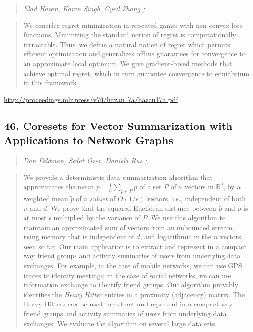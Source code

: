 \documentclass{article}
\begin{document}
\begin{quote}
\footnotesize{\textit{Elad Hazan, Karan Singh, Cyril Zhang ;}}

\end{quote}

\begin{quote}
    We consider regret minimization in repeated games with non-convex loss functions. Minimizing the standard notion of regret is computationally intractable. Thus, we define a natural notion of regret which permits efficient optimization and generalizes offline guarantees for convergence to an approximate local optimum. We give gradient-based methods that achieve optimal regret, which in turn guarantee convergence to equilibrium in this framework.  
\end{quote}

\href{http://proceedings.mlr.press/v70/hazan17a/hazan17a.pdf}{http://proceedings.mlr.press/v70/hazan17a/hazan17a.pdf}

\subsection{46. Coresets for Vector Summarization with Applications to Network Graphs}

\begin{quote}
\footnotesize{\textit{Dan Feldman, Sedat Ozer, Daniela Rus ;}}

\end{quote}

\begin{quote}
    We provide a deterministic data summarization algorithm that approximates the mean $\bar{p}=\frac{1}{n}\sum_{p\in P} p$ of a set $P$ of $n$ vectors in $\mathbb{R}^d$, by a weighted mean $\tilde{p}$ of a \textit{subset} of $O(1/\epsilon)$ vectors, i.e., independent of both $n$ and $d$. We prove that the squared Euclidean distance between $\bar{p}$ and $\tilde{p}$ is at most $\epsilon$ multiplied by the variance of $P$. We use this algorithm to maintain an approximated sum of vectors from an unbounded stream, using memory that is independent of $d$, and logarithmic in the $n$ vectors seen so far. Our main application is to extract and represent in a compact way friend groups and activity summaries of users from underlying data exchanges. For example, in the case of mobile networks, we can use GPS traces to identify meetings; in the case of social networks, we can use information exchange to identify friend groups. Our algorithm provably identifies the \textit{Heavy Hitter} entries in a proximity (adjacency) matrix. The Heavy Hitters can be used to extract and represent in a compact way friend groups and activity summaries of users from underlying data exchanges. We evaluate the algorithm on several large data sets.  
\end{quote}
\end{document}
